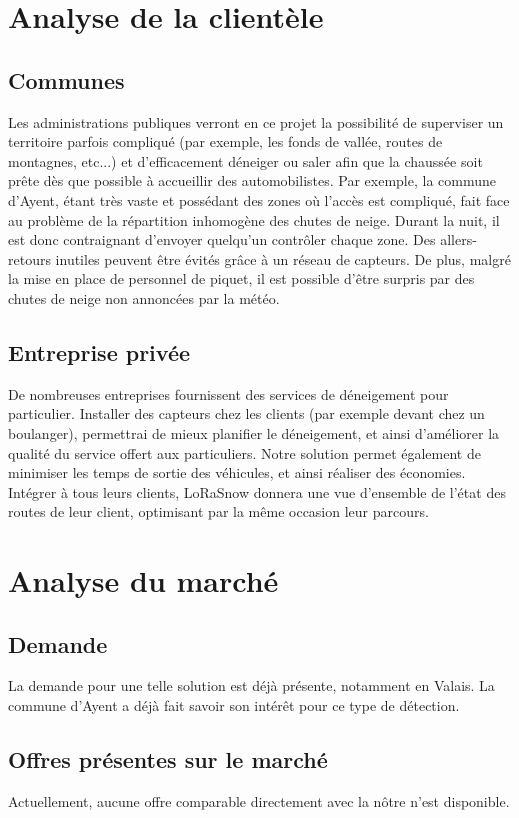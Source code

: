 \section{Analyse de la clientèle}
\subsection{Communes}
Les administrations publiques verront en ce projet la possibilité de superviser
un territoire parfois compliqué (par exemple, les fonds de vallée,
routes de montagnes, etc...) et d'efficacement déneiger ou saler
afin que la chaussée soit prête dès que possible à accueillir des automobilistes.
Par exemple, la commune d'Ayent, étant très vaste et possédant des zones
où l'accès est compliqué, fait face au problème de la répartition inhomogène
des chutes de neige. Durant la nuit, il est donc contraignant d'envoyer
quelqu'un contrôler chaque zone. Des allers-retours inutiles peuvent être
évités grâce à un réseau de capteurs.
De plus, malgré la mise en place de personnel de piquet, il est possible
d'être surpris par des chutes de neige non annoncées par la météo.

\subsection{Entreprise privée}
De nombreuses entreprises fournissent des services de déneigement pour particulier.
Installer des capteurs chez les clients (par exemple devant chez un boulanger),
permettrai de mieux planifier le déneigement, et ainsi d'améliorer la qualité
du service offert aux particuliers.
Notre solution permet également de minimiser les temps de sortie des véhicules,
et ainsi réaliser des économies.
Intégrer à tous leurs clients, LoRaSnow donnera une vue d'ensemble de l'état
des routes de leur client, optimisant par la même occasion leur parcours.
\newpage

\section{Analyse du marché}
\subsection{Demande}
La demande pour une telle solution est déjà présente, notamment en Valais.
La commune d'Ayent a déjà fait savoir son intérêt pour ce type de détection.

\subsection{Offres présentes sur le marché}
Actuellement, aucune offre comparable directement avec la nôtre n'est disponible.

